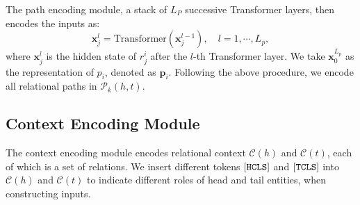 \documentclass{article}
\begin{document}
The path encoding module, a stack of $L_P$ successive Transformer layers, then encodes the inputs as:
 \begin{equation}
 \label{tf}
     \mathbf{x}^{l}_j = \mathrm{Transformer}(\mathbf{x}^{l-1}_j),\quad l=1,\cdots,L_p,
 \end{equation}
where $\mathbf{x}^{l}_j$ is the hidden state of $r^i_j$ after the $l$-th Transformer layer. 
We take $\mathbf{x}^{L_p}_0$ as the representation of $p_i$, denoted as $\mathbf{p}_i$. 
Following the above procedure, we encode all relational paths in $\mathcal{P}_k(h,t)$.

\subsection{Context Encoding Module}
The context encoding module encodes relational context $\mathcal{C}(h)$ and $\mathcal{C}(t)$, each of which is a set of relations.
We insert different tokens ${\small\tt [HCLS]}$ and ${\small\tt [TCLS]}$ into $\mathcal{C}(h)$ and $\mathcal{C}(t)$ to indicate different roles of head and tail entities, when constructing inputs.

\end{document}
